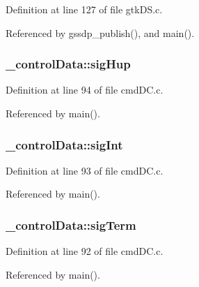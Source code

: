 Definition at line 127 of file gtk\+D\+S.\+c.



Referenced by gssdp\+\_\+publish(), and main().

\subsubsection[{\texorpdfstring{sig\+Hup}{sigHup}}]{ \+\_\+control\+Data\+::sig\+Hup}\hypertarget{struct__control_data_a551d0ecd4ceb9fc4ce8eebe5a984dc4c}{}\label{struct__control_data_a551d0ecd4ceb9fc4ce8eebe5a984dc4c}


Definition at line 94 of file cmd\+D\+C.\+c.



Referenced by main().

\subsubsection[{\texorpdfstring{sig\+Int}{sigInt}}]{ \+\_\+control\+Data\+::sig\+Int}\hypertarget{struct__control_data_ae8ad5b5af46f4ab4bcd6ffb41e83385b}{}\label{struct__control_data_ae8ad5b5af46f4ab4bcd6ffb41e83385b}


Definition at line 93 of file cmd\+D\+C.\+c.



Referenced by main().

\subsubsection[{\texorpdfstring{sig\+Term}{sigTerm}}]{ \+\_\+control\+Data\+::sig\+Term}\hypertarget{struct__control_data_af45dc1f0c4806eaac0a57da17db50fdb}{}\label{struct__control_data_af45dc1f0c4806eaac0a57da17db50fdb}


Definition at line 92 of file cmd\+D\+C.\+c.



Referenced by main().

